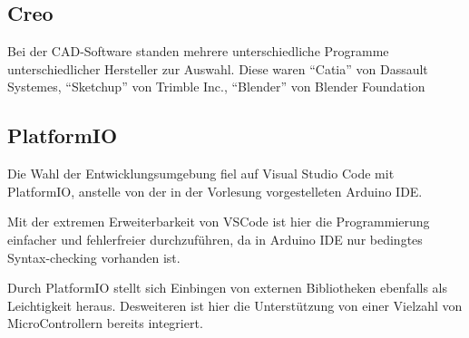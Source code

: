 \subsection{Creo}
Bei der CAD-Software standen mehrere unterschiedliche Programme unterschiedlicher Hersteller zur Auswahl.
Diese waren ``Catia'' von Dassault Systemes, ``Sketchup'' von Trimble Inc., ``Blender'' von Blender Foundation
\subsection{PlatformIO}
Die Wahl der Entwicklungsumgebung fiel auf Visual Studio Code mit PlatformIO, anstelle von der in der Vorlesung vorgestelleten Arduino IDE.

Mit der extremen Erweiterbarkeit von VSCode ist hier die Programmierung einfacher und fehlerfreier durchzuführen, da in Arduino IDE nur bedingtes Syntax-checking vorhanden ist.

Durch PlatformIO stellt sich Einbingen von externen Bibliotheken ebenfalls als Leichtigkeit heraus.
Desweiteren ist hier die Unterstützung von einer Vielzahl von MicroControllern bereits integriert.